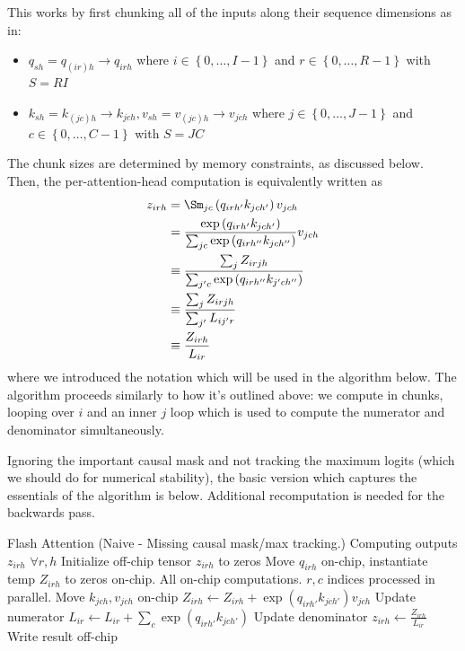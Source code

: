 \documentclass[11pt]{article}
\begin{document}
This works by first chunking all of the inputs along their sequence dimensions as in:
\begin{itemize}
    \item $  q _{ sh } =q _{ (ir)h }\longrightarrow  q _{ irh }  $ where $ i \in \left \{ 0, \ldots
        , I-1 \right \} $ and $ r \in \left \{ 0, \ldots , R-1 \right \} $ with $ S=RI $
    \item $ k _{ sh } = k _{ (jc)h } \longrightarrow  k _{jch} , v _{ sh } = v _{ (jc)h }
        \longrightarrow  v _{jch} $ where $ j \in \left \{ 0, \ldots , J-1 \right \} $ and $ c \in
        \left \{ 0, \ldots , C-1 \right \} $ with $ S=JC $
\end{itemize}
The chunk sizes are determined by memory constraints, as discussed below.  Then, the
per-attention-head computation is equivalently written as
\begin{align}
    z _{irh} &= \Sm _{jc} \left ( q _{ irh' } k _{ jch' }  \right ) v _{ jch } \nn
             &= \frac{ \exp \left (  q _{ irh' } k _{ jch' }  \right ) }{ \sum _{ jc }\exp \left ( q _{ irh'' } k _{ jch'' } \right ) } v _{ jch }\nn
             &\equiv \frac{\sum _{ j } Z _{ irjh } }{   \sum _{ j'c } \exp \left(q _{ irh'' } k _{ j'ch'' }\right) }\nn
             &\equiv \frac{\sum _{ j } Z _{ irjh } }{\sum _{ j' }L _{ ij'r }}\nn
             &\equiv \frac{ Z _{ irh } }{L _{ ir }}\nn
\end{align}
where we introduced the notation which will be used in the algorithm below. The algorithm proceeds
similarly to how it's outlined above: we compute in chunks, looping over $ i $ and an inner $ j$
loop which is used to compute the numerator and denominator simultaneously.

Ignoring the important causal mask and not tracking the maximum logits (which we should do for
numerical stability), the basic version which captures the essentials of the algorithm is below.
Additional recomputation is needed for the backwards pass.

\begin{algo}{Flash Attention (Naive - Missing causal mask/max tracking.)}
 \Comment Computing outputs $ z _{ irh } $ $ \forall r, h $
\State Initialize off-chip tensor $ z _{ irh }$ to zeros
\State Move  $ q _{ irh }$ on-chip, instantiate temp $Z _{ irh }$ to zeros on-chip.
\Comment All on-chip computations. $ r, c $ indices processed in parallel.
    \State Move  $ k_{ jch },v _{ jch }$ on-chip
    \State $ Z _{ irh } \gets   Z _{ irh } +\exp \left ( q _{ irh' } k _{ jch' }  \right ) v _{ jch }$ \Comment Update numerator
    \State $ L _{ ir } \gets   L _{ ir } +\sum _{ c }\exp \left ( q _{ irh' } k _{ jch' }  \right ) $ \Comment Update denominator
\EndFor
\State $ z _{ irh } \gets \frac{Z _{ irh }}{L _{ ir }}$ \Comment Write result off-chip
\EndFor
\label{algo_fa_fwd_basic}
\end{algo}
\end{document}
